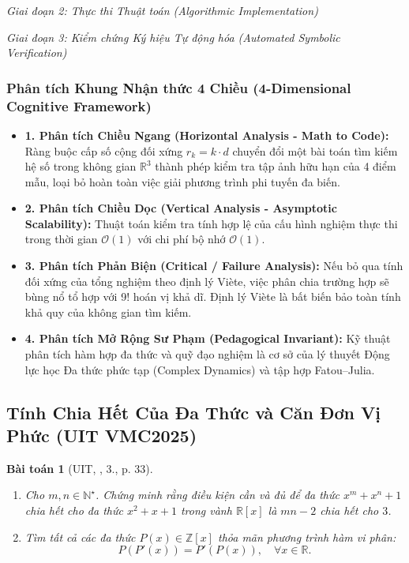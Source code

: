 \documentclass{article}
\newtheorem{baitoan}{Bài toán}
\begin{document}
\vspace{0.5em}\noindent\emph{Giai đoạn 2: Thực thi Thuật toán (Algorithmic Implementation)}


\vspace{0.5em}\noindent\emph{Giai đoạn 3: Kiểm chứng Ký hiệu Tự động hóa (Automated Symbolic Verification)}


\subsubsection*{Phân tích Khung Nhận thức 4 Chiều (4-Dimensional Cognitive Framework)}
\begin{itemize}
    \item \textbf{1. Phân tích Chiều Ngang (Horizontal Analysis - Math to Code):} Ràng buộc cấp số cộng đối xứng $r_k = k \cdot d$ chuyển đổi một bài toán tìm kiếm hệ số trong không gian $\mathbb{R}^3$ thành phép kiểm tra tập ảnh hữu hạn của 4 điểm mẫu, loại bỏ hoàn toàn việc giải phương trình phi tuyến đa biến.
    \item \textbf{2. Phân tích Chiều Dọc (Vertical Analysis - Asymptotic Scalability):} Thuật toán kiểm tra tính hợp lệ của cấu hình nghiệm thực thi trong thời gian $\mathcal{O}(1)$ với chi phí bộ nhớ $\mathcal{O}(1)$.
    \item \textbf{3. Phân tích Phản Biện (Critical / Failure Analysis):} Nếu bỏ qua tính đối xứng của tổng nghiệm theo định lý Viète, việc phân chia trường hợp sẽ bùng nổ tổ hợp với 9! hoán vị khả dĩ. Định lý Viète là bất biến bảo toàn tính khả quy của không gian tìm kiếm.
    \item \textbf{4. Phân tích Mở Rộng Sư Phạm (Pedagogical Invariant):} Kỹ thuật phân tích hàm hợp đa thức và quỹ đạo nghiệm là cơ sở của lý thuyết Động lực học Đa thức phức tạp (Complex Dynamics) và tập hợp Fatou--Julia.
\end{itemize}

\subsection{Tính Chia Hết Của Đa Thức và Căn Đơn Vị Phức (UIT VMC2025)}

\begin{baitoan}[UIT, \cite{VMS_VMC2025}, 3., p. 33]
\begin{enumerate}
    \item[(a)] Cho $m, n \in \mathbb{N}^\star$. Chứng minh rằng điều kiện cần và đủ để đa thức $x^m + x^n + 1$ chia hết cho đa thức $x^2 + x + 1$ trong vành $\mathbb{R}[x]$ là $mn - 2$ chia hết cho $3$.
    \item[(b)] Tìm tất cả các đa thức $P(x) \in \mathbb{Z}[x]$ thỏa mãn phương trình hàm vi phân:
    \begin{equation}
        P(P'(x)) = P'(P(x)), \quad \forall x \in \mathbb{R}.
    \end{equation}
\end{enumerate}
\end{baitoan}
\end{document}
